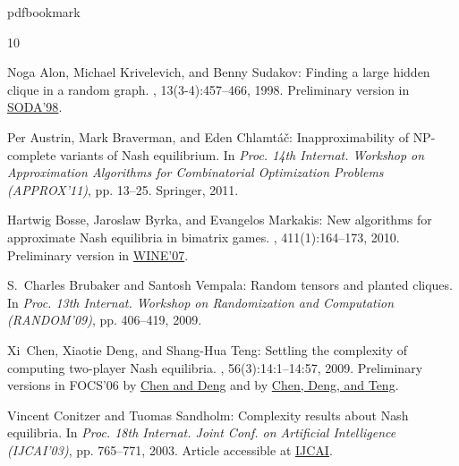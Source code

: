 %
%
%
%
%
\providecommand{\bibhead}[1]{}
%
\expandafter\ifx\csname pdfbookmark\endcsname\relax%
  \providecommand{\tocrefpdfbookmark}{}
\else\providecommand{\tocrefpdfbookmark}{%
   \hypertarget{tocreferences}{}%
   \pdfbookmark[1]{References}{tocreferences}}%
\fi

\tocrefpdfbookmark
\begin{thebibliography}{10}

\bibhead{AKS98}
{\sc Noga Alon, Michael Krivelevich, and Benny Sudakov}: Finding a large hidden
  clique in a random graph.
, 13(3-4):457--466, 1998.
\newblock Preliminary version in
  \href{http://dl.acm.org/citation.cfm?id=314613.315014}{SODA'98}.

\bibhead{ABC11}
{\sc Per Austrin, Mark Braverman, and Eden Chlamt\'{a}\v{c}}: Inapproximability
  of {NP}-complete variants of {N}ash equilibrium.
\newblock In {\em Proc. 14th Internat. Workshop on Approximation Algorithms for
  Combinatorial Optimization Problems (APPROX'11)}, pp. 13--25. Springer, 2011.
\newblock [\epfmtdoi{10.1007/978-3-642-22935-0\_2}]

\bibhead{BBM10}
{\sc Hartwig Bosse, Jaroslaw Byrka, and Evangelos Markakis}: New algorithms for
  approximate {N}ash equilibria in bimatrix games.
, 411(1):164--173, 2010.
\newblock Preliminary version in
  \href{http://dx.doi.org/10.1007/978-3-540-77105-0_6}{WINE'07}.

\bibhead{BV09}
{\sc S.~Charles Brubaker and Santosh Vempala}: Random tensors and planted
  cliques.
\newblock In {\em Proc. 13th Internat. Workshop on Randomization and
  Computation (RANDOM'09)}, pp. 406--419, 2009.
\newblock [\epfmtdoi{10.1007/978-3-642-03685-9\_31}]

\bibhead{CDT09}
{\sc Xi~Chen, Xiaotie Deng, and Shang-Hua Teng}: Settling the complexity of
  computing two-player {N}ash equilibria.
, 56(3):14:1--14:57, 2009.
\newblock Preliminary versions in FOCS'06 by
  \href{http://dx.doi.org/10.1109/FOCS.2006.69}{Chen and Deng} and by
  \href{http://dx.doi.org/10.1109/FOCS.2006.20}{Chen, Deng, and Teng}.
\newblock [\epfmtdoi{10.1145/1516512.1516516}]

\bibhead{CS03}
{\sc Vincent Conitzer and Tuomas Sandholm}: Complexity results about {N}ash
  equilibria.
\newblock In {\em Proc. 18th Internat. Joint Conf. on Artificial Intelligence
  (IJCAI'03)}, pp. 765--771, 2003.
\newblock Article accessible at
  \href{http://ijcai.org/Past\%20Proceedings/IJCAI-2003/PDF/111.pdf}{IJCAI}.


\end{thebibliography}
